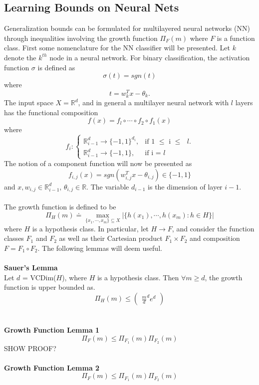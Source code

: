 \documentclass{article} %
\begin{document}
\subsection{Learning Bounds on Neural Nets}
Generalization bounds can be formulated for multilayered neural networks (NN) through inequalities involving the growth function $\Pi_F(m)$ where $F$ is a function class. First some nomenclature for the NN classifier will be presented. Let $k$ denote the $k^{th}$ node in a neural network. For binary classification, the activation function $\sigma$ is defined as
$$
\sigma(t) = sgn(t)
$$
where
$$
t = w_k^Tx - \theta_k.
$$
The input space $X = \mathbb{R}^d$, and in general a multilayer neural network with $l$ layers has the functional composition
$$
f(x) = f_l \circ \cdots \circ f_2 \circ f_1 (x)
$$
where
$$
f_i : \begin{cases}
    \mathbb{R}^d_{i-1} \rightarrow \{-1,1\}^{d_i}, & \text{if 1 $\leq$ i $\leq$ $l$}.\\
    \mathbb{R}^d_{i-1} \rightarrow \{-1,1\}, & \text{if i = $l$}
  \end{cases}
$$
The notion of a component function will now be presented as
$$
f_{i,j}(x) = sgn(w_{i,j}^Tx - \theta_{i,j}) \in \{-1,1\}
$$
and $x,w_{i,j} \in \mathbb{R}^d_{i-1}$, $\theta_{i,j} \in \mathbb{R}$. The variable $d_{i-1}$ is the dimension of layer $i-1$.
\\
\\
The growth function is defined to be
$$
\Pi_H(m) \doteq \max_{\{x_1,\cdots,x_m\} \subseteq X} |\{h(x_1),\cdots,h(x_m) : h \in H \} |
$$
where $H$ is a hypothesis class. In particular, let $H \rightarrow F$, and consider the function classes $F_1$ and $F_2$ as well as their Cartesian product $F_1 \times F_2$ and composition $F = F_1 \circ F_2$. The following lemmas will deem useful.
\\
\\
\textbf{Sauer's Lemma}
\\
Let $d$ = VCDim($H$), where $H$ is a hypothesis class. Then $\forall m \geq d$, the growth function is upper bounded as.
$$
\Pi_H(m) \leq \begin{pmatrix}
\frac{m}{d}^de^d
\end{pmatrix}
$$
\\
\\
\textbf{Growth Function Lemma 1}
$$
\Pi_F(m) \leq \Pi_{F_1}(m)\Pi_{F_2}(m)
$$
SHOW PROOF?
\\
\\
\textbf{Growth Function Lemma 2}
$$
\Pi_F(m) \leq \Pi_{F_1}(m)\Pi_{F_2}(m)
$$
\end{document}
